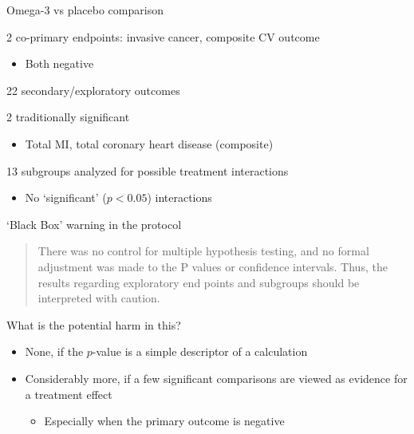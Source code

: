 \documentclass[ignorenonframetext,]{beamer}
\providecommand{\tightlist}{%
  \setlength{\itemsep}{0pt}\setlength{\parskip}{0pt}}
\begin{document}
\begin{frame}{Omega-3 vs placebo comparison}
\protect\hypertarget{omega-3-vs-placebo-comparison}{}

2 co-primary endpoints: invasive cancer, composite CV outcome

\begin{itemize}
\tightlist
\item
  Both negative
\end{itemize}

22 secondary/exploratory outcomes

2 traditionally significant

\begin{itemize}
\tightlist
\item
  Total MI, total coronary heart disease (composite)
\end{itemize}

13 subgroups analyzed for possible treatment interactions

\begin{itemize}
\tightlist
\item
  No `significant' (\(p < 0.05\)) interactions
\end{itemize}

\end{frame}

\begin{frame}{`Black Box' warning in the protocol}
\protect\hypertarget{black-box-warning-in-the-protocol}{}

\begin{quote}

There was no control for multiple hypothesis testing, and no formal adjustment was made to the P values or confidence intervals. Thus, the results regarding exploratory end points and subgroups should be interpreted with caution. 

\end{quote}

What is the potential harm in this?

\begin{itemize}
\item
  None, if the \(p\)-value is a simple descriptor of a calculation
\item
  Considerably more, if a few significant comparisons are viewed as
  evidence for a treatment effect

  \begin{itemize}
  \tightlist
  \item
    Especially when the primary outcome is negative
  \end{itemize}
\end{itemize}

\end{frame}
\end{document}
